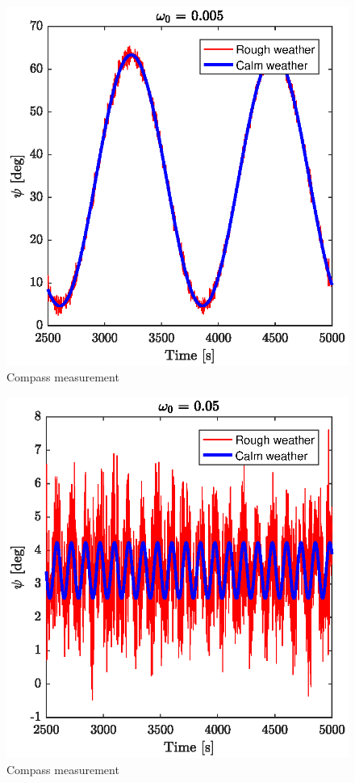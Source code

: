 \begin{figure}[h]
	\centering
	\includegraphics[width=\textwidth]{figures/Ass1_omega_005.eps}
	\caption{Compass measurement}
\label{fig:p5p1_0.005}
\end{figure}

\begin{figure}[h]
	\centering
	\includegraphics[width=\textwidth]{figures/Ass1_omega_05.eps}
	\caption{Compass measurement}
\label{fig:p5p1_0.05}
\end{figure}

